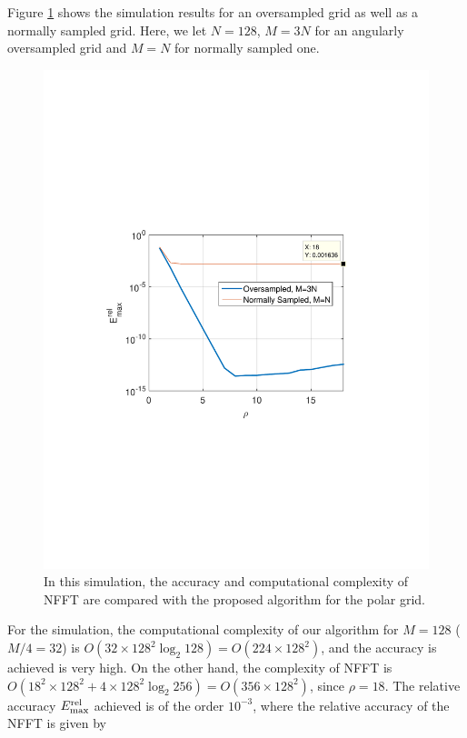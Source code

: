 \documentclass{UCF_ETD}
\begin{document}
{ Figure \ref{ComparisonNFFT.fig} shows the simulation results for an oversampled grid as well as a normally sampled grid. Here, we let  $N=128$, $M = 3N$ for an angularly oversampled grid and $M = N$ for normally sampled one.
 \begin{figure}[H]
 \begin{center}
 \includegraphics[scale=0.9]{PolarSphericalDFT/ComparisonNFFTExt}
 \caption{In this simulation, the accuracy and computational complexity of NFFT are compared with the proposed algorithm for the polar grid. }
 \label{ComparisonNFFT.fig}
 \end{center}
 \end{figure}
 For the simulation, the computational complexity of our algorithm for $M = 128$ ($M/4 =32$) is $O(32\times 128^2\log_2 128) = O(224 \times 128^2)$, and the accuracy is achieved is very high. On the other hand, the complexity of NFFT is $O(18^2 \times 128^2 + 4\times 128^2 \log_2 256 ) = O(356 \times 128^2 )$, since $\rho = 18$. The relative  accuracy $E^{\rm rel}_{\max}$ achieved is of the order $10^{-3}$, where the relative accuracy of the NFFT is given by
}
\end{document}
